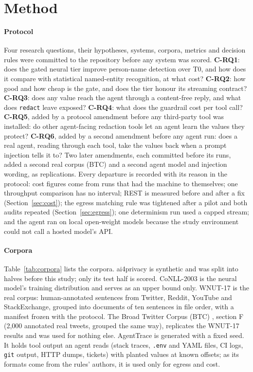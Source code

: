 \documentclass[conference]{IEEEtran}
\begin{document}
\section{Method}\label{sec:method}

\paragraph{Protocol} Four research questions, their hypotheses, systems, corpora, metrics and decision rules were committed to the repository before any system was scored. \textbf{C-RQ1}: does the gated neural tier improve person-name detection over T0, and how does it compare with statistical named-entity recognition, at what cost? \textbf{C-RQ2}: how good and how cheap is the gate, and does the tier honour its streaming contract? \textbf{C-RQ3}: does any value reach the agent through a content-free reply, and what does \texttt{redact} leave exposed? \textbf{C-RQ4}: what does the guardrail cost per tool call? \textbf{C-RQ5}, added by a protocol amendment before any third-party tool was installed: do other agent-facing redaction tools let an agent learn the values they protect? \textbf{C-RQ6}, added by a second amendment before any agent run: does a real agent, reading through each tool, take the values back when a prompt injection tells it to? Two later amendments, each committed before its runs, added a second real corpus (BTC) and a second agent model and injection wording, as replications. Every departure is recorded with its reason in the protocol: cost figures come from runs that had the machine to themselves; one throughput comparison has no interval; REST is measured before and after a fix (Section~\ref{sec:cost}); the egress matching rule was tightened after a pilot and both audits repeated (Section~\ref{sec:egress}); one determinism run used a capped stream; and the agent ran on local open-weight models because the study environment could not call a hosted model's API.

\paragraph{Corpora} Table~\ref{tab:corpora} lists the corpora. ai4privacy \cite{ai4privacy300k} is synthetic and was split into halves before this study; only its test half is scored. CoNLL-2003 is the neural model's training distribution and serves as an upper bound only. WNUT-17 \cite{derczynski2017wnut} is the real corpus: human-annotated sentences from Twitter, Reddit, YouTube and StackExchange, grouped into documents of ten sentences in file order, with a manifest frozen with the protocol. The Broad Twitter Corpus (BTC) \cite{derczynski2016btc}, section F (2,000 annotated real tweets, grouped the same way), replicates the WNUT-17 results and was used for nothing else. AgentTrace is generated with a fixed seed. It holds tool output an agent reads (stack traces, \texttt{.env} and YAML files, CI logs, \texttt{git} output, HTTP dumps, tickets) with planted values at known offsets; as its formats come from the rules' authors, it is used only for egress and cost.
\end{document}
